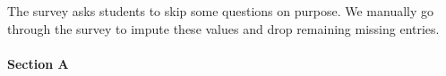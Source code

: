 \documentclass[]{article}
\newenvironment{Shaded}{\begin{snugshade}}{\end{snugshade}}
\newcommand{\ControlFlowTok}[1]{\textcolor[rgb]{0.13,0.29,0.53}{\textbf{#1}}}
\newcommand{\DataTypeTok}[1]{\textcolor[rgb]{0.13,0.29,0.53}{#1}}
\newcommand{\DecValTok}[1]{\textcolor[rgb]{0.00,0.00,0.81}{#1}}
\newcommand{\KeywordTok}[1]{\textcolor[rgb]{0.13,0.29,0.53}{\textbf{#1}}}
\newcommand{\NormalTok}[1]{#1}
\newcommand{\OperatorTok}[1]{\textcolor[rgb]{0.81,0.36,0.00}{\textbf{#1}}}
\newcommand{\StringTok}[1]{\textcolor[rgb]{0.31,0.60,0.02}{#1}}
\let\oldparagraph\paragraph
\renewcommand{\paragraph}[1]{\oldparagraph{#1}\mbox{}}
\begin{document}
\begin{Shaded}
\end{Shaded}

The survey asks students to skip some questions on purpose. We manually
go through the survey to impute these values and drop remaining missing
entries.

\hypertarget{section-a}{%
\paragraph{Section A}\label{section-a}}
\end{document}
